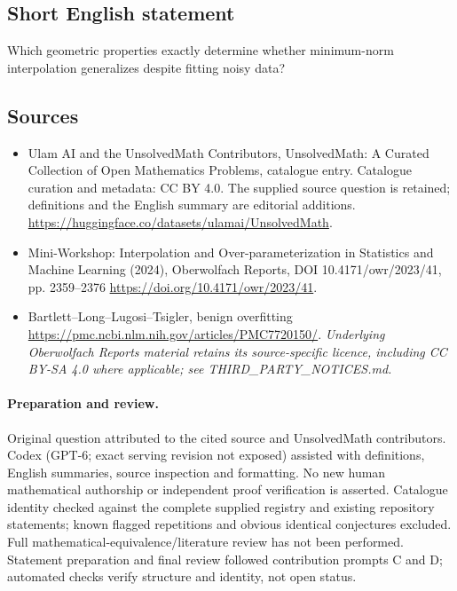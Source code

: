 \documentclass[11pt]{article}
\begin{document}
\subsection{Short English statement}
Which geometric properties exactly determine whether minimum-norm interpolation generalizes despite fitting noisy data?
\subsection{Sources}
\begin{itemize}
\item[\hypertarget{source:statement:1}{S1}] Ulam AI and the UnsolvedMath Contributors, UnsolvedMath: A Curated Collection of Open Mathematics Problems, catalogue entry. Catalogue curation and metadata: CC BY 4.0. The supplied source question is retained; definitions and the English summary are editorial additions.
\url{https://huggingface.co/datasets/ulamai/UnsolvedMath}.
\item[\hypertarget{source:statement:2}{S2}] Mini-Workshop: Interpolation and Over-parameterization in Statistics and Machine Learning​ (2024), Oberwolfach Reports, DOI 10.4171/owr/2023/41, pp. 2359--2376
\url{https://doi.org/10.4171/owr/2023/41}.
\item[\hypertarget{source:statement:3}{S3}] Bartlett--Long--Lugosi--Tsigler, benign overfitting
\url{https://pmc.ncbi.nlm.nih.gov/articles/PMC7720150/}.
\textit{Underlying Oberwolfach Reports material retains its source-specific licence, including CC BY-SA 4.0 where applicable; see THIRD\_PARTY\_NOTICES.md.}
\end{itemize}
\paragraph{Preparation and review.}
Original question attributed to the cited source and UnsolvedMath contributors. Codex (GPT-6; exact serving revision not exposed) assisted with definitions, English summaries, source inspection and formatting. No new human mathematical authorship or independent proof verification is asserted. Catalogue identity checked against the complete supplied registry and existing repository statements; known flagged repetitions and obvious identical conjectures excluded. Full mathematical-equivalence/literature review has not been performed. Statement preparation and final review followed contribution prompts C and D; automated checks verify structure and identity, not open status.
\label{end:statement}
\end{document}
